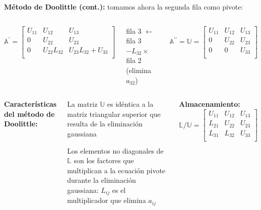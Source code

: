 \documentclass[9pt, aspectratio=169]{beamer}
\begin{document}
\begin{frame}
	\textbf{Método de Doolittle (cont.):} tomamos ahora la segunda fila como pivote:
	\begin{columns}
		\cx
		\begin{equation*}
			\mathbb{A}^{\prime}= \left[ \begin{array}{ccc}
					U_{11} & U_{12}       & U_{13}                 \\
					0      & U_{22}       & U_{23}                 \\
					0      & U_{22}L_{32} & U_{23} L_{32} + U_{33} \\
				\end{array} \right]
		\end{equation*}

		\cx
		\begin{center}
			fila 3 $\leftarrow$ fila 3 $- L_{32} \times$ fila 2 (elimina $a_{32}$)
		\end{center}
		\begin{equation*}
			\mathbb{A}^{\prime \prime} = \mathbb{U} = \left[
				\begin{array}{ccc}
					U_{11} & U_{12} & U_{13} \\
					0      & U_{22} & U_{23} \\
					0      & 0      & U_{33} \\
				\end{array} \right]
		\end{equation*}
	\end{columns}
	\bigskip \pause
	\begin{columns}[t]
		\cw{0.4}
		\textbf{Características del método de Doolittle:} \medskip

		\begin{itemize} {\small
				\item La matriz $\mathbb{U}$ es idéntica a la matriz triangular superior que resulta de la eliminación gaussiana
				\medskip

				\item Los elementos no diagonales de $\mathbb{L}$ son los factores que multiplican a la ecuación pivote durante la eliminación gaussiana: $L_{ij}$ es el multiplicador que elimina $a_{ij}$ }
		\end{itemize} \pause
		\cw{0.4}
		\textbf{Almacenamiento:} \bigskip
		\begin{equation*}
			\mathbb{L}/\mathbb{U} = \left[
				\begin{array}{ccc}
					U_{11} & U_{12} & U_{13} \\
					L_{21} & U_{22} & U_{23} \\
					L_{31} & L_{32} & U_{33} \\
				\end{array} \right]
		\end{equation*}
	\end{columns}
\end{frame}
\end{document}
